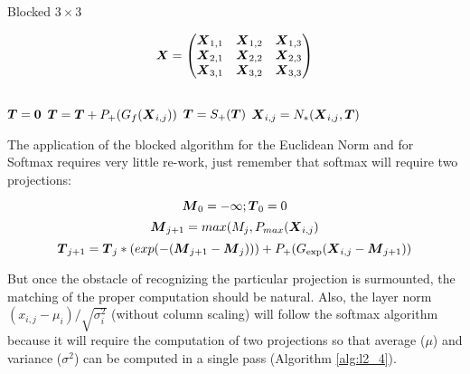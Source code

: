 \documentclass[acmsmall]{acmart}
\begin{document}
\begin{algorithm}
    \caption{Blocked $3\times 3$}
    \label{alg:l2_3}
    \begin{algorithmic}
      \STATE \[
        {\boldsymbol X}  =   \begin{pmatrix}
          {\boldsymbol X}_{1,1} &    {\boldsymbol X}_{1,2}&    {\boldsymbol X}_{1,3}  \\
          {\boldsymbol X}_{2,1} &    {\boldsymbol X}_{2,2}&    {\boldsymbol X}_{2,3}  \\
          {\boldsymbol X}_{3,1} &    {\boldsymbol X}_{3,2}&    {\boldsymbol X}_{3,3}  \\
        \end{pmatrix}
      \] \\
          \STATE ${\boldsymbol T} = {\boldsymbol 0} $  
              \STATE ${\boldsymbol T} = {\boldsymbol T} +P_+(G_{f}({\boldsymbol X}_{i,j}))$   
          \ENDWHILE
          \STATE ${\boldsymbol T}  =   S_+({\boldsymbol T})$       
             \STATE $ {\boldsymbol X}_{i,j} = N_*({\boldsymbol X}_{i,j},{\boldsymbol T})$  
          \ENDWHILE
      \ENDWHILE
    \end{algorithmic}
\end{algorithm}

The application of the blocked algorithm for the Euclidean Norm and
for Softmax requires very little re-work, just remember that softmax
will require two projections:

\begin{equation} {\boldsymbol M}_0 = -\infty; {\boldsymbol T}_0 = 0 \end{equation}
\begin{equation} {\boldsymbol M}_{j+1} = max(M_j, P_{max}({\boldsymbol X}_{i,j}) \end{equation}
\begin{equation} {\boldsymbol T}_{j+1} = {\boldsymbol T}_j*(exp(-({\boldsymbol M}_{j+1}-{\boldsymbol M}_j))) + P_+(G_{\exp}({\boldsymbol X}_{i,j}-{\boldsymbol M}_{j+1})) \end{equation}

But once the obstacle of recognizing the particular projection is
surmounted, the matching of the proper computation should be
natural. Also, the layer norm $(x_{i,j} - \mu_i)/\sqrt{\sigma^2_i}$
(without column scaling) will follow the softmax algorithm because it
will require the computation of two projections so that average
($\mu$) and variance ($\sigma^2$) can be computed in a single pass (Algorithm \ref{alg:l2_4}).
\end{document}
